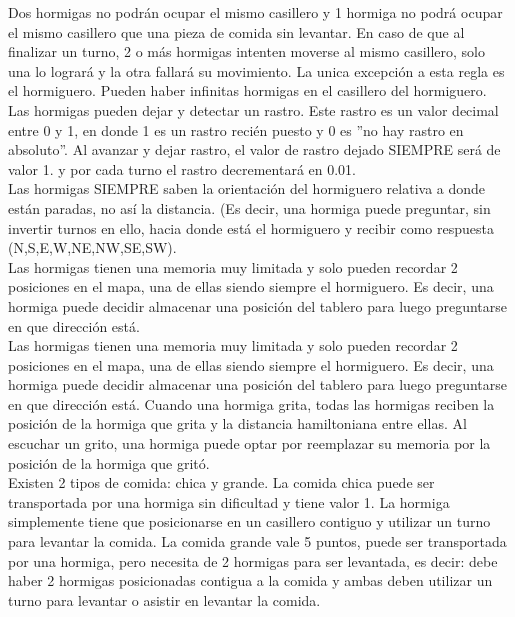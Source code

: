 \documentclass[a4paper,10pt]{article}
\begin{document}
Dos hormigas no podrán ocupar el mismo casillero y 1 hormiga no podrá ocupar 
el mismo casillero que una pieza de comida sin levantar. En caso de que al
finalizar un turno, 2 o más hormigas intenten moverse al mismo casillero, solo
una lo logrará y la otra fallará su movimiento. La unica excepción a esta regla
es el hormiguero. Pueden haber infinitas hormigas en el casillero del hormiguero.
Las hormigas pueden dejar y detectar un rastro. Este rastro es un valor decimal
entre 0 y 1, en donde 1 es un rastro recién puesto y 0 es ”no hay rastro en
absoluto”. Al avanzar y dejar rastro, el valor de rastro dejado SIEMPRE será 
de valor 1. y por cada turno el rastro decrementará en 0.01.\\

Las hormigas SIEMPRE saben la orientación del hormiguero relativa a donde
están paradas, no así la distancia. (Es decir, una hormiga puede preguntar, sin
invertir turnos en ello, hacia donde está el hormiguero y recibir como respuesta
(N,S,E,W,NE,NW,SE,SW).\\

Las hormigas tienen una memoria muy limitada y solo pueden recordar 2 posiciones 
en el mapa, una de ellas siendo siempre el hormiguero. Es decir, una
hormiga puede decidir almacenar una posición del tablero para luego preguntarse
en que dirección está.\\

Las hormigas tienen una memoria muy limitada y solo pueden recordar 2 posiciones 
en el mapa, una de ellas siendo siempre el hormiguero. Es decir, una
hormiga puede decidir almacenar una posición del tablero para luego preguntarse
en que dirección está.
Cuando una hormiga grita, todas las hormigas reciben la posición de la hormiga
que grita y la distancia hamiltoniana entre ellas. Al escuchar un grito, una
hormiga puede optar por reemplazar su memoria por la posición de la hormiga
que gritó.\\

Existen 2 tipos de comida: chica y grande. La comida chica puede ser transportada 
por una hormiga sin dificultad y tiene valor 1. La hormiga simplemente
tiene que posicionarse en un casillero contiguo y utilizar un turno para levantar
la comida. La comida grande vale 5 puntos, puede ser transportada por una
hormiga, pero necesita de 2 hormigas para ser levantada, es decir: debe haber
2 hormigas posicionadas contigua a la comida y ambas deben utilizar un turno
para levantar o asistir en levantar la comida.\\
\end{document}
